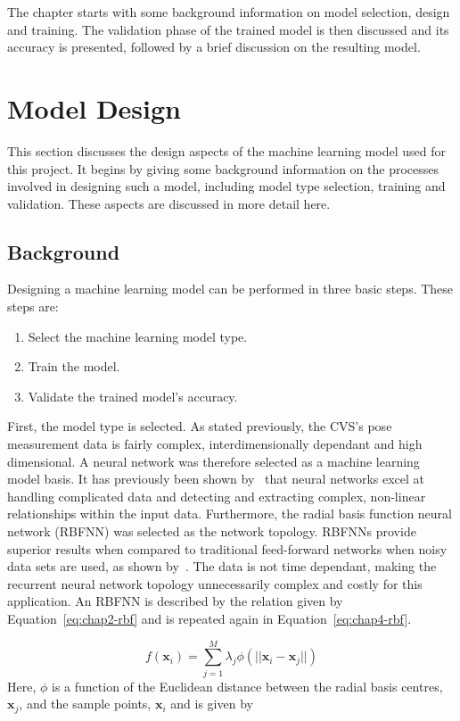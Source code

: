 The chapter starts with some background information on model selection, design and training. The validation phase of the trained model is then discussed and its accuracy is presented, followed by a brief discussion on the resulting model. 

\section{Model Design}

This section discusses the design aspects of the machine learning model used for this project. It begins by giving some background information on the processes involved in designing such a model, including model type selection, training and validation. These aspects are discussed in more detail here.  

\subsection{Background}

Designing a machine learning model can be performed in three basic steps. These steps are:

\begin{enumerate}
  \item Select the machine learning model type.
  \item Train the model.
  \item Validate the trained model's accuracy. 
\end{enumerate}

First, the model type is selected. As stated previously, the CVS's pose measurement data is fairly complex, interdimensionally dependant and high dimensional. A neural network was therefore selected as a machine learning model basis. It has previously been shown by~\cite{tu1996advantages} that neural networks excel at handling complicated data and detecting and extracting complex, non-linear relationships within the input data. Furthermore, the radial basis function neural network (RBFNN) was selected as the network topology. RBFNNs provide superior results when compared to traditional feed-forward networks when noisy data sets are used, as shown by~\cite{xie2011comparison}. The data is not time dependant, making the recurrent neural network topology unnecessarily complex and costly for this application. An RBFNN is described by the relation given by Equation~\ref{eq:chap2-rbf} and is repeated again in Equation~\ref{eq:chap4-rbf}.

\begin{equation}
  \label{eq:chap4-rbf}
  f(\bm{x}_i) = \sum\limits_{j = 1}^{M}\lambda_j \phi(|| \bm{x}_i - \bm{x}_j ||)
\end{equation}
Here, $\phi$ is a function of the Euclidean distance between the radial basis centres, $\bm{x}_j$, and the sample points, $\bm{x}_i$ and is given by 

